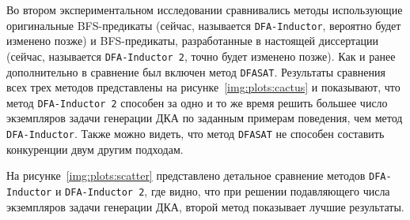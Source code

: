 \begin{table}[ht]
  \caption{Медианное время работы методов генерации ДКА по заданным примерам поведения с использованием BFS-предикатов нарушения симметрии, DFS-предикатов нарушения симметрии и метода \texttt{DFASAT} в секундах.}
  \centering
  \label{tab:DFS-results}
\end{table}

Во втором экспериментальном исследовании сравнивались методы использующие оригинальные BFS-предикаты (сейчас, называется \texttt{DFA-Inductor}, вероятно будет изменено позже) и BFS-предикаты, разработанные в настоящей диссертации (сейчас, называется \texttt{DFA-Inductor~2}, точно будет изменено позже).
Как и ранее дополнительно в сравнение был включен метод \texttt{DFASAT}.
Результаты сравнения всех трех методов представлены на рисунке~\ref{img:plots:cactus} и показывают, что метод \texttt{DFA-Inductor~2} способен за одно и то же время решить большее число экземпляров задачи генерации ДКА по заданным примерам поведения, чем метод \texttt{DFA-Inductor}.
Также можно видеть, что метод \texttt{DFASAT} не способен составить конкуренции двум другим подходам.

На рисунке~\ref{img:plots:scatter} представлено детальное сравнение методов \texttt{DFA-Inductor} и \texttt{DFA-Inductor~2}, где видно, что при решении подавляющего числа экземпляров задачи генерации ДКА, второй метод показывает лучшие результаты.

